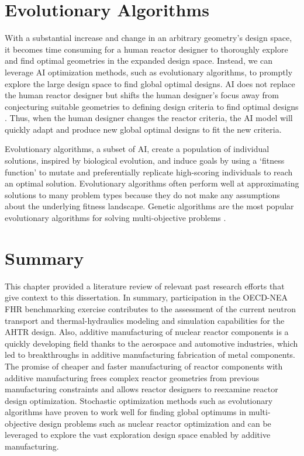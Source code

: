 \section{Evolutionary Algorithms} 
\label{sec:ea}
With a substantial increase and change in an arbitrary geometry's design space, 
it becomes time consuming for a human reactor designer to thoroughly explore 
and find optimal geometries in the expanded design space. 
Instead, we can leverage \gls{AI} optimization methods, such as evolutionary 
algorithms, to promptly explore the large design space to find global optimal 
designs. 
\gls{AI} does not replace the human reactor designer but shifts the human 
designer's focus away from conjecturing suitable geometries to defining design 
criteria to find optimal designs \cite{sobes_artificial_2020}. 
Thus, when the human designer changes the reactor criteria, the \gls{AI} 
model will quickly adapt and produce new global optimal designs to fit the new 
criteria.  

Evolutionary algorithms, a subset of \gls{AI}, create a population of individual 
solutions, inspired by biological evolution, and induce goals by using a 
`fitness function' to mutate and preferentially replicate high-scoring 
individuals to reach an optimal solution.
Evolutionary algorithms often perform well at approximating solutions to many 
problem types because they do not make any assumptions about the 
underlying fitness landscape.
Genetic algorithms are the most popular evolutionary algorithms for solving 
multi-objective problems \cite{byrne_evolving_2014, krish_practical_2011}. 


\section{Summary}
This chapter provided a literature review of relevant past research 
efforts that give context to this dissertation. 
In summary, participation in the OECD-NEA FHR benchmarking exercise contributes 
to the assessment of the current neutron transport and thermal-hydraulics 
modeling and simulation capabilities for the \gls{AHTR} design.
Also, additive manufacturing of nuclear reactor components is a quickly 
developing field thanks to the aerospace and automotive industries, which led to 
breakthroughs in additive manufacturing fabrication of metal components. 
The promise of cheaper and faster manufacturing of reactor components with 
additive manufacturing frees complex reactor geometries from previous 
manufacturing constraints and allows reactor designers to reexamine reactor 
design optimization.  
Stochastic optimization methods such as evolutionary algorithms have proven to 
work well for finding global optimums in multi-objective design problems such as 
nuclear reactor optimization and can be leveraged to explore the vast exploration 
design space enabled by additive manufacturing.
